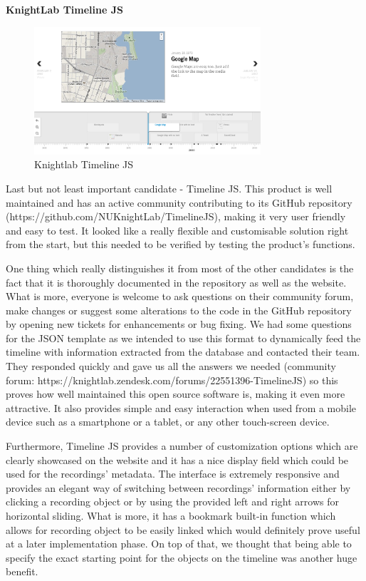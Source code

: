 \documentclass{l3proj}
\begin{document}
\textbf{KnightLab Timeline JS}

\begin{figure}[ht!]
  \centering
\includegraphics[width=0.75\textwidth]{images/timeline-example.png}
\caption{Knightlab Timeline JS}
\end{figure}

Last but not least important candidate - Timeline JS. This product is well maintained and has an active community contributing to its GitHub repository (https://github.com/NUKnightLab/TimelineJS), making it very user friendly and easy to test. It looked like a really flexible and customisable solution right from the start, but this needed to be verified by testing the product's functions.

One thing which really distinguishes it from most of the other candidates is the fact that it is thoroughly documented in the repository as well as the website. What is more, everyone is welcome to ask questions on their community forum, make changes or suggest some alterations to the code in the GitHub repository by opening new tickets for enhancements or bug fixing. We had some questions for the JSON template as we intended to use this format to dynamically feed the timeline with information extracted from the database and contacted their team. They responded quickly and gave us all the answers we needed (community forum: https://knightlab.zendesk.com/forums/22551396-TimelineJS) so this proves how well maintained this open source software is, making it even more attractive. It also provides simple and easy interaction when used from a mobile device such as a smartphone or a tablet, or any other touch-screen device.

Furthermore, Timeline JS provides a number of customization options which are clearly showcased on the website and it has a nice display field which could be used for the recordings' metadata. The interface is extremely responsive and provides an elegant way of switching between recordings' information either by clicking a recording object or by using the provided left and right arrows for horizontal sliding. What is more, it has a bookmark built-in function which allows for recording object to be easily linked which would definitely prove useful at a later implementation phase. On top of that, we thought that being able to specify the exact starting point for the objects on the timeline was another huge benefit.
\end{document}
